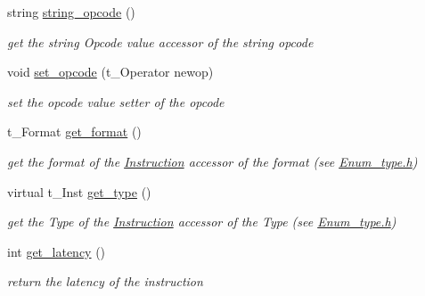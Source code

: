 \begin{DoxyCompactItemize}
string \mbox{\hyperlink{class_instruction_aeba180e03a3ac7f7ecba7635d454566f}{string\+\_\+opcode}} ()
\begin{DoxyCompactList}\small\item\em get the string Opcode value accessor of the string opcode \end{DoxyCompactList}\item 
\mbox{\label{class_instruction_a49524f35c4ade25c663d798e3a5df2cb}} 
void \mbox{\hyperlink{class_instruction_a49524f35c4ade25c663d798e3a5df2cb}{set\+\_\+opcode}} (t\+\_\+\+Operator newop)
\begin{DoxyCompactList}\small\item\em set the opcode value setter of the opcode \end{DoxyCompactList}\item 
\mbox{\label{class_instruction_a86e8d9627ad78884d75481693a6196ef}} 
t\+\_\+\+Format \mbox{\hyperlink{class_instruction_a86e8d9627ad78884d75481693a6196ef}{get\+\_\+format}} ()
\begin{DoxyCompactList}\small\item\em get the format of the \mbox{\hyperlink{class_instruction}{Instruction}} accessor of the format (see \mbox{\hyperlink{_enum__type_8h_source}{Enum\+\_\+type.\+h}}) \end{DoxyCompactList}\item 
\mbox{\label{class_instruction_ae619398c5531b1f2042fb4caa893cdee}} 
virtual t\+\_\+\+Inst \mbox{\hyperlink{class_instruction_ae619398c5531b1f2042fb4caa893cdee}{get\+\_\+type}} ()
\begin{DoxyCompactList}\small\item\em get the Type of the \mbox{\hyperlink{class_instruction}{Instruction}} accessor of the Type (see \mbox{\hyperlink{_enum__type_8h_source}{Enum\+\_\+type.\+h}}) \end{DoxyCompactList}\item 
\mbox{\label{class_instruction_ac2988d2fb858b720e009da03120ae4c7}} 
int \mbox{\hyperlink{class_instruction_ac2988d2fb858b720e009da03120ae4c7}{get\+\_\+latency}} ()
\begin{DoxyCompactList}\small\item\em return the latency of the instruction \end{DoxyCompactList}\item 

\end{DoxyCompactItemize}
